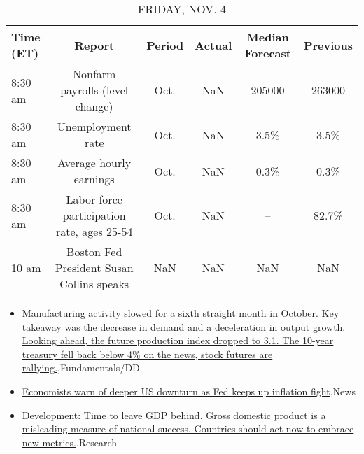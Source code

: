 \documentclass{article}%
\begin{document}
%


\begin{table}[htbp]%
\caption{FRIDAY, NOV. 4}%
\centering%
\begin{adjustbox}{width=1\textwidth}%
\begin{tabular}{lccccc}
\toprule
Time (ET) &                                     Report & Period & Actual & Median Forecast & Previous \\
\midrule
  8:30 am &            Nonfarm payrolls (level change) &   Oct. &    NaN &          205000 &   263000 \\
  8:30 am &                          Unemployment rate &   Oct. &    NaN &            3.5\% &     3.5\% \\
  8:30 am &                    Average hourly earnings &   Oct. &    NaN &            0.3\% &     0.3\% \\
  8:30 am & Labor-force participation rate, ages 25-54 &   Oct. &    NaN &              -- &    82.7\% \\
    10 am &  Boston Fed President Susan Collins speaks &    NaN &    NaN &             NaN &      NaN \\
\bottomrule
\end{tabular}
%
\end{adjustbox}%
\end{table}

%
\begin{itemize}%
\item%
\href{https://reddit.com/r/StockMarket/comments/yj6xsu/manufacturing\_activity\_slowed\_for\_a\_sixth/}{Manufacturing activity slowed for a sixth straight month in October. Key takeaway was the decrease in demand and a deceleration in output growth. Looking ahead, the future production index dropped to 3.1. The 10-year treasury fell back below 4\% on the news, stock futures are rallying.},Fundamentals/DD%
\item%
\href{https://reddit.com/r/Economics/comments/yj6hns/economists\_warn\_of\_deeper\_us\_downturn\_as\_fed/}{Economists warn of deeper US downturn as Fed keeps up inflation fight},News%
\item%
\href{https://reddit.com/r/Economics/comments/yj1zur/development\_time\_to\_leave\_gdp\_behind\_gross/}{Development: Time to leave GDP behind. Gross domestic product is a misleading measure of national success. Countries should act now to embrace new metrics.},Research%
\end{itemize}%
\end{document}
